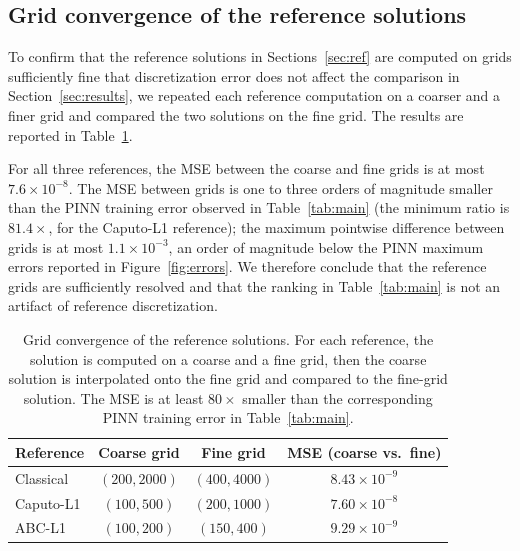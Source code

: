 \documentclass[11pt]{article}
\begin{document}
\subsection{Grid convergence of the reference solutions}
\label{sec:grid_convergence}

To confirm that the reference solutions in Sections~\ref{sec:ref}
are computed on grids sufficiently fine that discretization error does
not affect the comparison in Section~\ref{sec:results}, we repeated
each reference computation on a coarser and a finer grid and compared
the two solutions on the fine grid. The results are reported in
Table~\ref{tab:grid_convergence}.

For all three references, the MSE between the coarse and fine grids
is at most \(7.6\times 10^{-8}\). The MSE between grids is one to three orders
of magnitude smaller than the PINN training error observed in
Table~\ref{tab:main} (the minimum ratio is \(81.4\times\), for the
Caputo-L1 reference); the maximum pointwise difference between grids
is at most \(1.1\times 10^{-3}\), an order of magnitude below the
PINN maximum errors reported in Figure~\ref{fig:errors}. We therefore
conclude that the reference grids are sufficiently resolved and that
the ranking in Table~\ref{tab:main} is not an artifact of reference
discretization.

\begin{table}[h]
\centering
\caption{Grid convergence of the reference solutions. For each
         reference, the solution is computed on a coarse and a fine
         grid, then the coarse solution is interpolated onto the fine
         grid and compared to the fine-grid solution. The MSE is at least \(80\times\) smaller than the corresponding PINN training error in
         Table~\ref{tab:main}.}
\label{tab:grid_convergence}
\begin{tabular}{lccc}
\toprule
Reference & Coarse grid & Fine grid & MSE (coarse vs.\ fine) \\
\midrule
Classical & \((200, 2000)\) & \((400, 4000)\) & \(8.43\times 10^{-9}\) \\
Caputo-L1 & \((100, 500)\)  & \((200, 1000)\) & \(7.60\times 10^{-8}\) \\
ABC-L1    & \((100, 200)\)  & \((150, 400)\)  & \(9.29\times 10^{-9}\) \\
\bottomrule
\end{tabular}
\end{table}
\end{document}
